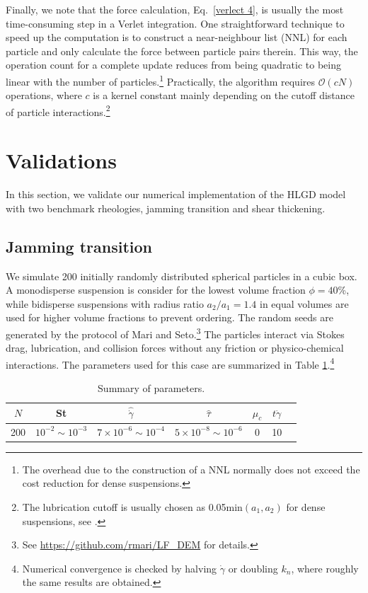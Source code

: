 Finally, we note that the force calculation, Eq.\ \eqref{verlect 4}, is usually the most time-consuming step in a Verlet integration. One straightforward technique to speed up the computation is to construct a near-neighbour list (NNL) for each particle and only calculate the force between particle pairs therein. This way, the operation count for a complete update reduces from being quadratic to being linear with the number of particles.\footnote{The overhead due to the construction of a NNL normally does not exceed the cost reduction for dense suspensions.} Practically, the algorithm requires $\mathcal{O}(cN)$ operations, where $c$ is a kernel constant mainly depending on the cutoff distance of particle interactions.\footnote{The lubrication cutoff is usually chosen as 0.05min$(a_1,a_2)$ for dense suspensions, see \cite{Cheal_Ness_2018}.}


\section{Validations}
\label{valid}

In this section, we validate our numerical implementation of the HLGD model with two benchmark rheologies, \ie jamming transition and shear thickening.

\subsection{Jamming transition}

We simulate 200 initially randomly distributed spherical particles in a cubic box. A monodisperse suspension is consider for the lowest volume fraction $\phi=40$\%, while bidisperse suspensions with radius ratio $a_2/a_1=1.4$ in equal volumes are used for higher volume fractions to prevent ordering. The random seeds are generated by the protocol of Mari and Seto.\footnote{See \url{https://github.com/rmari/LF_DEM} for details.} The particles interact via Stokes drag, lubrication, and collision forces without any friction or physico-chemical interactions. The parameters used for this case are summarized in Table \ref{tab:param}.\footnote{Numerical convergence is checked by halving $\dot{\gamma}$ or doubling $k_n$, where roughly the same results are obtained.}

\begin{table}[h]
  \centering
  \caption{Summary of parameters.}
  \renewcommand{\arraystretch}{1.2}%
  \begin{tabular}{ccccccc}
    \hline
    $N$ & St & $\hat{\dot{\gamma}}$ & $\hat{\tau}$ & $\mu_c$ & $t\dot{\gamma}$\\
    \hline
    200 & $10^{-2}\sim 10^{-3}$ & $7\times 10^{-6}\sim 10^{-4}$ & $5\times 10^{-8}\sim 10^{-6}$  & 0 & 10 \\
    \hline
  \end{tabular}
  \label{tab:param}
\end{table}


